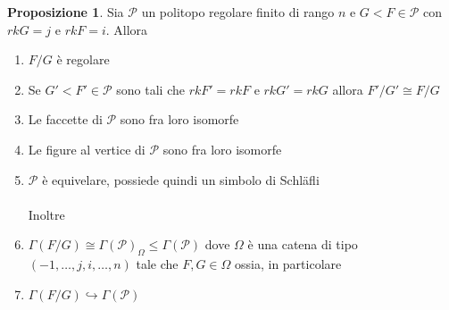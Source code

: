 \documentclass[a4paper,12pt]{report}
\newcommand{\p}{\mathcal{P}}
\theoremstyle{plain}
\theoremstyle{definition}
\newtheorem{prop}[teo]{Proposizione}
\newcommand\locallabel[1]{\label{\currentprefix_#1}}
\begin{document}
\begin{prop}
\label{prop:RegularSections}
Sia $\p$ un politopo regolare finito di rango $n$ e $G<F\in\p$ con $rkG=j$ e $rkF=i$. Allora
\begin{enumerate}
\item\locallabel{1} $F/G$ \`e regolare
\item\locallabel{2} Se $G'<F'\in\p$ sono tali che $rkF'=rkF$ e $rkG'=rkG$ allora $F'/G'\cong F/G$
\item\locallabel{3} Le faccette di $\p$ sono fra loro isomorfe
\item\locallabel{4} Le figure al vertice di $\p$ sono fra loro isomorfe
\item\locallabel{5} $\p$ \`e equivelare, possiede quindi un simbolo di Schl\"afli\\\\
Inoltre
\item\locallabel{6} $\Gamma(F/G)\cong \Gamma(\p)_\Omega\leq\Gamma(\p)$ dove $\Omega$ \`e una catena di tipo $(-1,\dots,j,i,\dots,n)$ tale che $F,G\in\Omega$ ossia, in particolare
\item\locallabel{7} $\Gamma(F/G)\hookrightarrow\Gamma(\p)$
\end{enumerate}
\end{prop}
\end{document}
